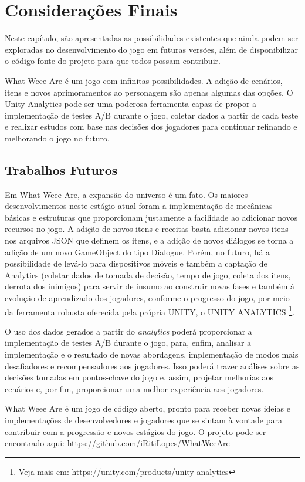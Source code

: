 \chapter{Considerações Finais}
\label{conclusao}

Neste capítulo, são apresentadas as possibilidades existentes que ainda podem ser exploradas no desenvolvimento do jogo em futuras versões, além de disponibilizar o código-fonte do projeto para que todos possam contribuir.

What Weee Are é um jogo com infinitas possibilidades. A adição de cenários, itens e novos aprimoramentos ao personagem são apenas algumas das opções. O Unity Analytics pode ser uma poderosa ferramenta capaz de propor a implementação de testes A/B durante o jogo, coletar dados a partir de cada teste e realizar estudos com base nas decisões dos jogadores para continuar refinando e melhorando o jogo no futuro.

\section{Trabalhos Futuros}
Em What Weee Are, a expansão do universo é um fato. Os maiores desenvolvimentos neste estágio atual foram a implementação de mecânicas básicas e estruturas que proporcionam justamente a facilidade ao adicionar novos recursos no jogo. A adição de novos itens e receitas basta adicionar novos itens nos arquivos JSON que definem os itens, e a adição de novos diálogos se torna a adição de um novo GameObject do tipo Dialogue. Porém, no futuro, há a possibilidade de levá-lo para dispositivos móveis e também a captação de Analytics (coletar dados de tomada de decisão, tempo de jogo, coleta dos itens, derrota dos inimigos) para servir de insumo ao construir novas fases e também à evolução de aprendizado dos jogadores, conforme o progresso do jogo, por meio da ferramenta robusta oferecida pela própria UNITY, o UNITY ANALYTICS \footnote{Veja mais em: https://unity.com/products/unity-analytics}.

O uso dos dados gerados a partir do \textit{analytics} poderá proporcionar a implementação de testes A/B durante o jogo, para, enfim, analisar a implementação e o resultado de novas abordagens, implementação de modos mais desafiadores e recompensadores aos jogadores. Isso poderá trazer análises sobre as decisões tomadas em pontos-chave do jogo e, assim, projetar melhorias aos cenários e, por fim, proporcionar uma melhor experiência aos jogadores.

What Weee Are é um jogo de código aberto, pronto para receber novas ideias e implementações de desenvolvedores e jogadores que se sintam à vontade para contribuir com a progressão e novos estágios do jogo. O projeto pode ser encontrado aqui: \url{https://github.com/iRitiLopes/WhatWeeAre}


